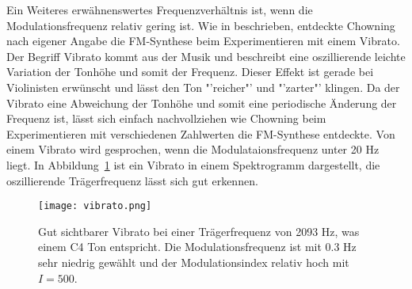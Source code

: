 Ein Weiteres erwähnenswertes Frequenzverhältnis ist, wenn die Modulationsfrequenz relativ gering ist.
Wie in  beschrieben, entdeckte Chowning nach eigener Angabe die FM-Synthese beim Experimentieren mit einem Vibrato. Der Begriff Vibrato kommt aus der Musik und beschreibt eine oszillierende leichte Variation der Tonhöhe und somit der Frequenz. Dieser Effekt ist gerade bei Violinisten erwünscht und lässt den Ton "'reicher"' und "'zarter"' klingen. \cite[S. 422]{tobias} Da der Vibrato eine Abweichung der Tonhöhe und somit eine periodische Änderung der Frequenz ist, lässt sich einfach nachvollziehen wie Chowning beim Experimentieren mit verschiedenen Zahlwerten die FM-Synthese entdeckte. Von einem Vibrato wird gesprochen, wenn die Modulataionsfrequenz unter 20 Hz liegt. In Abbildung~\ref{fig:vibrato} ist ein Vibrato in einem Spektrogramm dargestellt, die oszillierende Trägerfrequenz lässt sich gut erkennen.

\begin{figure} [ht]
\centering
  \texttt{[image: vibrato.png]}
\caption{Gut sichtbarer Vibrato bei einer Trägerfrequenz von 2093 Hz, was einem C4 Ton entspricht. Die Modulationsfrequenz ist mit 0.3 Hz sehr niedrig gewählt und der Modulationsindex relativ hoch mit $I=500$.}
\label{fig:vibrato}
\end{figure}











\FloatBarrier 